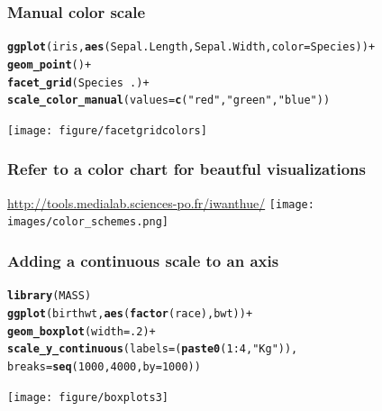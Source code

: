 \documentclass{beamer}\usepackage[]{graphicx}\usepackage[]{color}
\makeatletter
\newcommand{\hlnum}[1]{\textcolor[rgb]{0.686,0.059,0.569}{#1}}%
\newcommand{\hlstr}[1]{\textcolor[rgb]{0.192,0.494,0.8}{#1}}%
\newcommand{\hlopt}[1]{\textcolor[rgb]{0,0,0}{#1}}%
\newcommand{\hlstd}[1]{\textcolor[rgb]{0.345,0.345,0.345}{#1}}%
\newcommand{\hlkwc}[1]{\textcolor[rgb]{0.333,0.667,0.333}{#1}}%
\newcommand{\hlkwd}[1]{\textcolor[rgb]{0.737,0.353,0.396}{\textbf{#1}}}%
\newenvironment{kframe}{%
 \def\at@end@of@kframe{}%
 \ifinner\ifhmode%
  \def\at@end@of@kframe{\end{minipage}}%
  \begin{minipage}{\columnwidth}%
 \fi\fi%
 \def\FrameCommand##1{\hskip\@totalleftmargin \hskip-\fboxsep
 \colorbox{shadecolor}{##1}\hskip-\fboxsep
     \hskip-\linewidth \hskip-\@totalleftmargin \hskip\columnwidth}%
 \MakeFramed {\advance\hsize-\width
   \@totalleftmargin\z@ \linewidth\hsize
   \@setminipage}}%
 {\par\unskip\endMakeFramed%
 \at@end@of@kframe}
\newenvironment{knitrout}{}{} %
\makeatother
\begin{document}

\begin{frame}[fragile]
\frametitle{Manual color scale}
\begin{knitrout}\footnotesize
{}\color{fgcolor}\begin{kframe}
\begin{alltt}
\hlkwd{ggplot}\hlstd{(iris,} \hlkwd{aes}\hlstd{(Sepal.Length, Sepal.Width,} \hlkwc{color} \hlstd{= Species))} \hlopt{+}
\hlkwd{geom_point}\hlstd{()} \hlopt{+}
\hlkwd{facet_grid}\hlstd{(Species} \hlopt{~} \hlstd{.)} \hlopt{+}
\hlkwd{scale_color_manual}\hlstd{(}\hlkwc{values} \hlstd{=} \hlkwd{c}\hlstd{(}\hlstr{"red"}\hlstd{,} \hlstr{"green"}\hlstd{,} \hlstr{"blue"}\hlstd{))}
\end{alltt}
\end{kframe}

{\centering \texttt{[image: figure/facetgridcolors]} 

}



\end{knitrout}
\end{frame}


\begin{frame}[fragile]
\frametitle{Refer to a color chart for beautful visualizations}
\begin{center}
\url{http://tools.medialab.sciences-po.fr/iwanthue/}
\newline
\newline
\texttt{[image: images/color\_schemes.png]}
\end{center}
\end{frame}


\begin{frame}[fragile]
\frametitle{Adding a continuous scale to an axis}
\begin{knitrout}\footnotesize
{}\color{fgcolor}\begin{kframe}
\begin{alltt}
\hlkwd{library}\hlstd{(MASS)}
\hlkwd{ggplot}\hlstd{(birthwt,} \hlkwd{aes}\hlstd{(}\hlkwd{factor}\hlstd{(race), bwt))} \hlopt{+}
\hlkwd{geom_boxplot}\hlstd{(}\hlkwc{width} \hlstd{=} \hlnum{.2}\hlstd{)} \hlopt{+}
\hlkwd{scale_y_continuous}\hlstd{(}\hlkwc{labels} \hlstd{= (}\hlkwd{paste0}\hlstd{(}\hlnum{1}\hlopt{:}\hlnum{4}\hlstd{,} \hlstr{" Kg"}\hlstd{)),}
\hlkwc{breaks} \hlstd{=} \hlkwd{seq}\hlstd{(}\hlnum{1000}\hlstd{,} \hlnum{4000}\hlstd{,} \hlkwc{by} \hlstd{=} \hlnum{1000}\hlstd{))}
\end{alltt}
\end{kframe}

{\centering \texttt{[image: figure/boxplots3]} 

}



\end{knitrout}
\end{frame}
\end{document}
